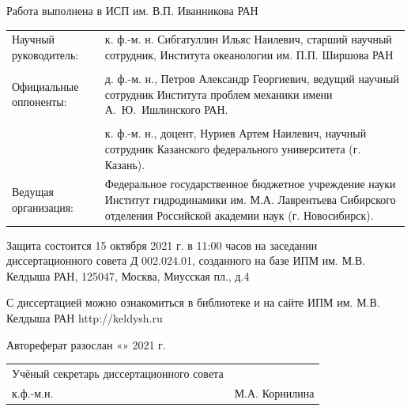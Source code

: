 \documentclass[utf8x]{G7-32} %
\begin{document}
\newpage
\pagestyle{empty}
\begin{spacing}{1.2}
\pagestyle{empty}
\begin{flushleft}
  Работа выполнена в ИСП им. В.П. Иванникова РАН
\end{flushleft}
\pagestyle{empty}
\begin{flushleft}
\begin{tabular}{p{5.8cm} p{10.5cm}}
    Научный руководитель: & к. ф.-м. н. Сибгатуллин Ильяс Наилевич, старший научный сотрудник, Института океанологии им. П.П. Ширшова РАН  \\

    \\

    Официальные оппоненты: &  д. ф.-м. н., Петров Александр Георгиевич, ведущий научный сотрудник Института проблем механики имени А.~Ю.~Ишлинского РАН. \\
  

    \\

    & к. ф.-м. н., доцент, Нуриев Артем Наилевич, научный сотрудник Казанского федерального университета (г. Казань).
    
    \\

    Ведущая организация: & Федеральное государственное бюджетное учреждение науки 
    Институт гидродинамики им. М.А. Лаврентьева Сибирского отделения Российской академии наук (г. Новосибирск). 
    
\end{tabular}
\end{flushleft}

\begin{flushleft}
    Защита состоится 15 октября 2021 г. в 11:00 часов на заседании диссертационного совета Д 002.024.01, созданного на базе ИПМ им. М.В. Келдыша РАН, 125047, Москва, Миусская пл., д.4

    \setlength{\parskip}{1em}

    С диссертацией можно ознакомиться в библиотеке и на сайте ИПМ им. М.В. Келдыша РАН http://keldysh.ru 

    \setlength{\parskip}{1em}
    \vspace{1cm}
    Автореферат разослан «\underline{\hspace{1cm}}» \underline{\hspace{4cm}} 2021 г.    
\end{flushleft}
\vspace{2cm}
\setlength{\parskip}{1em}
\begin{flushleft}
    \begin{tabular}{p{10cm} p{5cm}}

        Учёный секретарь диссертационного совета \\ к.ф.-м.н.  
    & М.А. Корнилина  
        
    \end{tabular}
\end{flushleft}
\end{spacing}
\newpage
\end{document}
